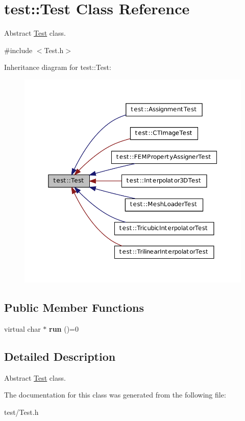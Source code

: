 \hypertarget{classtest_1_1_test}{
\section{test::Test Class Reference}
\label{classtest_1_1_test}
}


Abstract \hyperlink{classtest_1_1_test}{Test} class.  




{\ttfamily \#include $<$Test.h$>$}



Inheritance diagram for test::Test:\nopagebreak
\begin{figure}[H]
\begin{center}
\leavevmode
\includegraphics[width=364pt]{classtest_1_1_test__inherit__graph}
\end{center}
\end{figure}
\subsection*{Public Member Functions}
\begin{DoxyCompactItemize}
\item 
\hypertarget{classtest_1_1_test_a98216d05f4365404d1fa7343cc01f7c7}{
virtual char $\ast$ {\bfseries run} ()=0}
\label{classtest_1_1_test_a98216d05f4365404d1fa7343cc01f7c7}

\end{DoxyCompactItemize}


\subsection{Detailed Description}
Abstract \hyperlink{classtest_1_1_test}{Test} class. 

The documentation for this class was generated from the following file:\begin{DoxyCompactItemize}
\item 
test/Test.h\end{DoxyCompactItemize}
